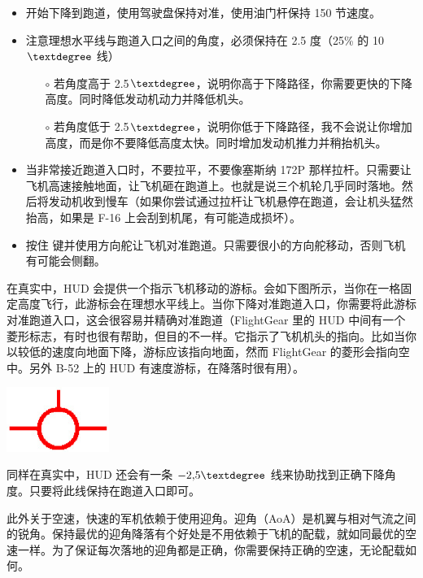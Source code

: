 \begin{itemize}
\item 开始下降到跑道，使用驾驶盘保持对准，使用油门杆保持 150 节速度。
\item 注意理想水平线与跑道入口之间的角度，必须保持在 2.5 度（25\% 的 10$\textdegree$ 线）
\begin{itemize}
\item [$\circ$] 若角度高于 2.5$\textdegree$，说明你高于下降路径，你需要更快的下降高度。同时降低发动机动力并降低机头。
\item [$\circ$] 若角度低于 2.5$\textdegree$，说明你低于下降路径，我不会说让你增加高度，而是你不要降低高度太快。同时增加发动机推力并稍抬机头。
\end{itemize}

\item 当非常接近跑道入口时，不要拉平，不要像塞斯纳 172P 那样拉杆。只需要让飞机高速接触地面，让飞机砸在跑道上。也就是说三个机轮几乎同时落地。然后将发动机收到慢车（如果你尝试通过拉杆让飞机悬停在跑道，会让机头猛然抬高，如果是 F-16 上会刮到机尾，有可能造成损坏）。

\item 按住  键并使用方向舵让飞机对准跑道。只需要很小的方向舵移动，否则飞机有可能会侧翻。
\end{itemize}

在真实中，HUD 会提供一个指示飞机移动的游标。会如下图所示，当你在一格固定高度飞行，此游标会在理想水平线上。当你下降对准跑道入口，你需要将此游标对准跑道入口，这会很容易并精确对准跑道（FlightGear 里的 HUD 中间有一个菱形标志，有时也很有帮助，但目的不一样。它指示了飞机机头的指向。比如当你以较低的速度向地面下降，游标应该指向地面，然而 FlightGear 的菱形会指向空中。另外 B-52 上的 HUD 有速度游标，在降落时很有用）。

\begin{center}
\includegraphics[width=0.25\textwidth]{img/tut_56}
\end{center}

同样在真实中，HUD 还会有一条 $-2,\!5\textdegree$ 线来协助找到正确下降角度。只要将此线保持在跑道入口即可。

此外关于空速，快速的军机依赖于使用迎角。迎角（AoA）是机翼与相对气流之间的锐角。保持最优的迎角降落有个好处是不用依赖于飞机的配载，就如同最优的空速一样。为了保证每次落地的迎角都是正确，你需要保持正确的空速，无论配载如何。

